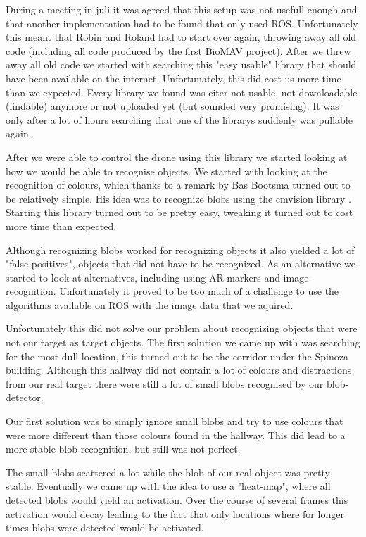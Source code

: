 \documentclass[a4paper,10pt]{article}
\begin{document}
During a meeting in juli it was agreed that this setup was not usefull enough and that another implementation had to be found that only used ROS. 
Unfortunately this meant that Robin and Roland had to start over again, throwing away all old code (including all code produced by the first BioMAV project).  
After we threw away all old code we started with searching this "easy usable" library that should have been available on the internet. 
Unfortunately, this did cost us more time than we expected.
Every library we found was eiter not usable, not downloadable (findable) anymore or not uploaded yet (but sounded very promising). 
It was only after a lot of hours searching that one of the librarys suddenly was pullable again. 

After we were able to control the drone using this library we started looking at how we would be able to recognise objects. 
We started with looking at the recognition of colours, which thanks to a remark by Bas Bootsma turned out to be relatively simple. 
His idea was to recognize blobs using the cmvision library \cite{cmvision}. 
Starting this library turned out to be pretty easy, tweaking it turned out to cost more time than expected. 

Although recognizing blobs worked for recognizing objects it also yielded a lot of "false-positives", objects that did not have to be recognized.
As an alternative we started to look at alternatives, including using AR markers and image-recognition. 
Unfortunately it proved to be too much of a challenge to use the algorithms available on ROS with the image data that we aquired. 

Unfortunately this did not solve our problem about recognizing objects that were not our target as target objects.
The first solution we came up with was searching for the most dull location, this turned out to be the corridor under the Spinoza building. 
Although this hallway did not contain a lot of colours and distractions from our real target there were still a lot of small blobs recognised by our blob-detector. 

Our first solution was to simply ignore small blobs and try to use colours that were more different than those colours found in the hallway. 
This did lead to a more stable blob recognition, but still was not perfect. 

The small blobs scattered a lot while the blob of our real object was pretty stable. 
Eventually we came up with the idea to use a "heat-map", where all detected blobs would yield an activation. 
Over the course of several frames this activation would decay leading to the fact that only locations where for longer times blobs were detected would be activated. 
\end{document}
